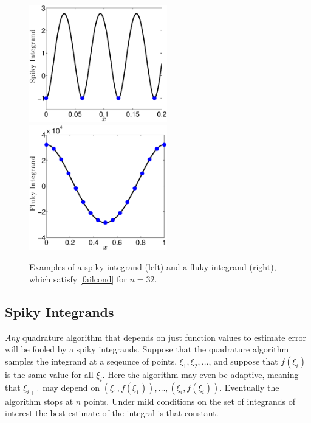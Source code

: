 \documentclass[]{amsart}
\theoremstyle{definition}
\theoremstyle{remark}
\begin{document}
\begin{figure}
\centering 
\includegraphics[width=6cm]{SpikyIntegFigcolor.eps} \quad
\includegraphics[width=6cm]{FlukyIntegFigcolor.eps}
\caption{Examples of a spiky integrand (left) and a fluky integrand (right), which satisfy \eqref{failcond} for $n=32$. \label{spikeflukefig}}
\end{figure}

\subsection{Spiky Integrands} \emph{Any} quadrature algorithm that depends on just function values to estimate error will be fooled by a spiky integrands.  Suppose that the quadrature algorithm samples the integrand at a seqeunce of points, $\xi_1, \xi_2, \ldots$, and suppose that $f(\xi_i)$ is the same value for all $\xi_i$.  Here the algorithm may even be adaptive, meaning that $\xi_{i+1}$ may depend on $(\xi_1, f(\xi_1)), \ldots, (\xi_i, f(\xi_i))$.  Eventually the algorithm stops at $n$ points.  Under mild conditions on the set of integrands of interest the best estimate of the integral is that constant. 
\end{document}
